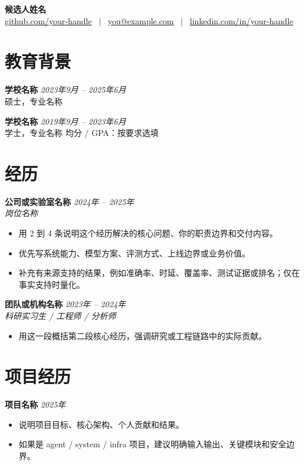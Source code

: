 \documentclass[UTF8,a4paper,11pt]{ctexart}
\newcommand{\cvneedspace}[1]{%
  \par\ifdim\dimexpr\pagegoal-\pagetotal\relax<#1\relax\newpage\fi
}
\newcommand{\cvsection}[1]{\cvneedspace{4\baselineskip}\section{#1}}
\begin{document}
\pagestyle{empty}

\begin{center}
\Huge\textbf{候选人姓名} \\[5pt]
\normalsize
\href{https://github.com/your-handle}{github.com/your-handle} \ $|$ \
\href{mailto:you@example.com}{you@example.com} \ $|$ \
\href{https://www.linkedin.com/in/your-handle}{linkedin.com/in/your-handle}
\end{center}

\cvsection{教育背景}
\cvneedspace{3\baselineskip}
\textbf{学校名称} \hfill \textit{2023年9月 -- 2025年6月}\\
硕士，专业名称

\cvneedspace{3\baselineskip}
\textbf{学校名称} \hfill \textit{2019年9月 -- 2023年6月}\\
学士，专业名称 \hfill 均分 / GPA：按要求选填

\cvsection{经历}
\cvneedspace{4\baselineskip}
\textbf{公司或实验室名称} \hfill \textit{2024年 -- 2025年}\\
\textit{岗位名称}
{\small
\begin{itemize}[leftmargin=1.2em,itemsep=2pt,topsep=3pt]
  \item 用 2 到 4 条说明这个经历解决的核心问题、你的职责边界和交付内容。
  \item 优先写系统能力、模型方案、评测方式、上线边界或业务价值。
  \item 补充有来源支持的结果，例如准确率、时延、覆盖率、测试证据或排名；仅在事实支持时量化。
\end{itemize}
}

\cvneedspace{4\baselineskip}
\textbf{团队或机构名称} \hfill \textit{2023年 -- 2024年}\\
\textit{科研实习生 / 工程师 / 分析师}
{\small
\begin{itemize}[leftmargin=1.2em,itemsep=2pt,topsep=3pt]
  \item 用这一段概括第二段核心经历，强调研究或工程链路中的实际贡献。
\end{itemize}
}

\cvsection{项目经历}
\cvneedspace{4\baselineskip}
\textbf{项目名称} \hfill \textit{2025年}\\
{\small
\begin{itemize}[leftmargin=1.2em,itemsep=2pt,topsep=3pt]
  \item 说明项目目标、核心架构、个人贡献和结果。
  \item 如果是 agent / system / infra 项目，建议明确输入输出、关键模块和安全边界。
\end{itemize}
}
\end{document}
